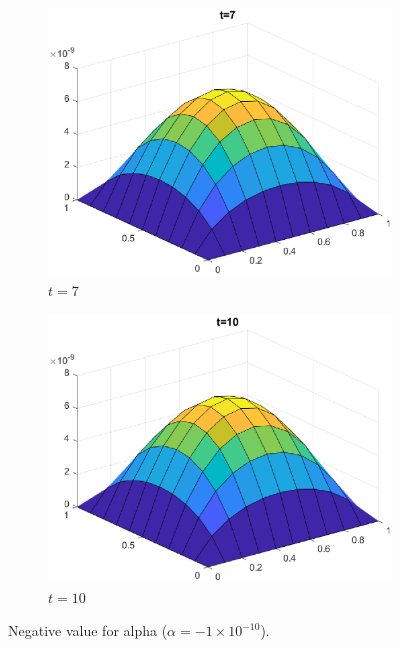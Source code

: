 \documentclass[]{article}
\begin{document}
	\begin{figure}[htbp]
		\centering	
		\vspace{1em}
		
		\begin{subfigure}[b]{0.45\textwidth}
			\includegraphics[width=\textwidth]{images/h4_t3.eps}
			\caption{$t = 7$}
			\label{fig:image7}
		\end{subfigure}
		\hfill
		\begin{subfigure}[b]{0.45\textwidth}
			\includegraphics[width=\textwidth]{images/h4_t4.eps}
			\caption{$t = 10$}
			\label{fig:image4}
		\end{subfigure}
		
		\caption{Negative value for alpha ($\alpha = -1 \times 10^{-10}$).}
		\label{fig:all_images}
	\end{figure}
	\newpage
\end{document}
